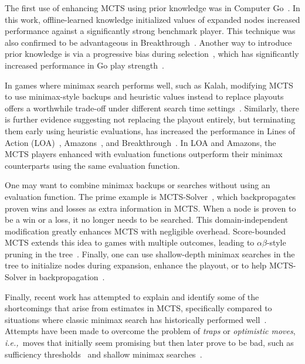 \documentclass{article}
\newcommand{\ie}{{\it i.e.,}~}
\begin{document}
The first use of enhancing MCTS using prior knowledge was in Computer Go~\cite{Gelly07Combining}. 
In this work, offline-learned knowledge initialized values of expanded nodes increased performance against a significantly 
strong benchmark player. 
This technique was also confirmed to be advantageous in Breakthrough~\cite{Lorentz13Breakthrough}. 
Another way to introduce prior knowledge is via a progressive bias during selection~\cite{Chaslot08Progressive}, which has 
significantly increased performance in Go play strength~\cite{Chaslot10Adding}. 

In games where minimax search performs well, such as Kalah, 
modifying MCTS to use minimax-style backups and heuristic values instead to replace playouts offers a worthwhile trade-off 
under different search time settings~\cite{Ramanujan11Tradeoffs}.
Similarly, there is further evidence suggesting not replacing the playout entirely, but terminating them early 
using heuristic evaluations, has increased the performance in Lines of Action (LOA)~\cite{Winands10MCTS-LOA}, 
Amazons~\cite{Kloetzer10Amazons,Lorentz08Amazons}, and Breakthrough~\cite{Lorentz13Breakthrough}. In LOA and Amazons, the 
MCTS players enhanced with evaluation functions outperform their minimax counterparts using the same evaluation function.



One may want to combine minimax backups or searches without using an evaluation function. 
The prime example is MCTS-Solver~\cite{Winands08Solver}, which backpropagates proven wins and losses as 
extra information in MCTS. When a node is proven to be a 
win or a loss, it no longer needs to be searched. This domain-independent modification greatly enhances 
MCTS with negligible overhead. Score-bounded MCTS extends this idea to games with multiple 
outcomes, leading to $\alpha \beta$-style pruning in the tree~\cite{Cazenave10Score}. Finally, one can use shallow-depth
minimax searches in the tree to initialize nodes during expansion, enhance the playout, or to help MCTS-Solver 
in backpropagation~\cite{Baier13MinimaxHybrids}.

Finally, recent work has attempted to explain and identify some of the shortcomings that arise from estimates in 
MCTS, specifically compared to situations where classic minimax search has historically performed 
well~\cite{Ramanujan10Understanding,Ramanujan10On}. 
Attempts have been made to overcome the problem of {\it traps} or {\it optimistic moves}, \ie moves that initially seem 
promising but then later prove to be bad, such as sufficiency 
thresholds~\cite{Gudmindsson13Sufficiency} and shallow minimax searches~\cite{Baier13MinimaxHybrids}. 
\end{document}
